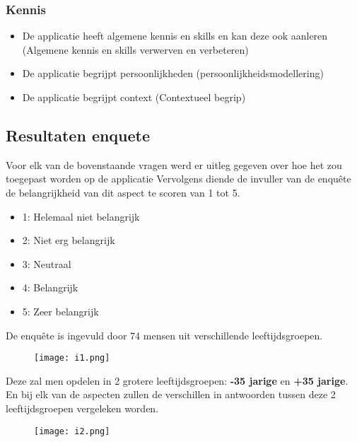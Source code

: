 \subsubsection{Kennis}

\begin{itemize}
    \item De applicatie heeft algemene kennis en skills en kan deze ook aanleren (Algemene kennis en skills verwerven en verbeteren)
    \item De applicatie begrijpt persoonlijkheden (persoonlijkheidsmodellering)
    \item De applicatie begrijpt context (Contextueel begrip)
\end{itemize}

\subsection{Resultaten enquete}

Voor elk van de bovenstaande vragen werd er uitleg gegeven over hoe het zou toegepast worden op de applicatie Vervolgens diende de invuller van de enquête de belangrijkheid van dit aspect te scoren van 1 tot 5.

\begin{itemize}
    \item 1: Helemaal niet belangrijk
    \item 2: Niet erg belangrijk
    \item 3: Neutraal
    \item 4: Belangrijk
    \item 5: Zeer belangrijk
\end{itemize}

De enquête is ingevuld door 74 mensen uit verschillende leeftijdsgroepen.

\begin{figure}[htbp]
    \centering
    \texttt{[image: i1.png]}
    \label{fig:leeftijdsgroepen_resultaat}
\end{figure}

Deze zal men opdelen in 2 grotere leeftijdsgroepen: \textbf{-35 jarige} en \textbf{+35 jarige}. En bij elk van de aspecten zullen de verschillen in antwoorden tussen deze 2 leeftijdsgroepen vergeleken worden.

\begin{figure}[htbp]
    \centering
    \texttt{[image: i2.png]}
    \label{fig:ai_kennis_resultaat}
\end{figure}

